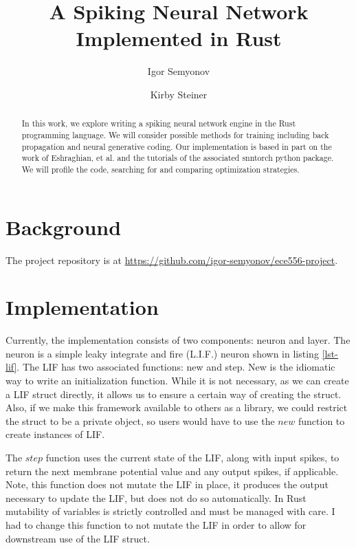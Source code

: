 \documentclass[12pt,english]{article}
\title{
    A Spiking Neural Network Implemented in Rust
}
\author{Igor Semyonov}
\author{Kirby Steiner}
\affil{George Mason University}
\begin{document}
\maketitle

\begin{abstract}
    In this work, we explore writing a spiking neural network engine in the Rust programming language.
    We will consider possible methods for training including back propagation and neural generative coding.
    Our implementation is based in part on the work of Eshraghian, et al. \cite{snntorch} and the tutorials of the associated snntorch python package.
    We will profile the code, searching for and comparing optimization strategies.
\end{abstract}

\section{Background}

The project repository is at \href{https://github.com/igor-semyonov/ece556-project}{https://github.com/igor-semyonov/ece556-project}.

\section{Implementation}

Currently, the implementation consists of two components: neuron and layer.
The neuron is a simple leaky integrate and fire (L.I.F.) neuron shown in listing \ref{lst-lif}.
The LIF has two associated functions: new and step.
New is the idiomatic way to write an initialization function.
While it is not necessary, as we can create a LIF struct directly, it allows us to ensure a certain way of creating the struct.
Also, if we make this framework available to others as a library, we could restrict the struct to be a private object, so users would have to use the $new$ function to create instances of LIF.

The $step$ function uses the current state of the LIF, along with input spikes, to return the next membrane potential value and any output spikes, if applicable.
Note, this function does not mutate the LIF in place, it produces the output necessary to update the LIF, but does not do so automatically.
In Rust mutability of variables is strictly controlled and must be managed with care.
I had to change this function to not mutate the LIF in order to allow for downstream use of the LIF struct.
\end{document}

